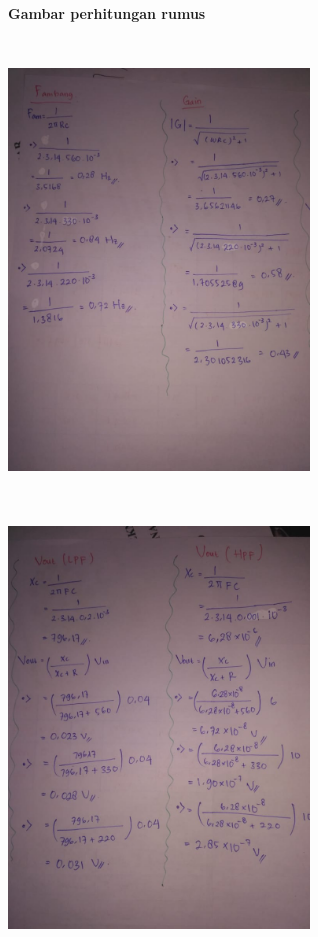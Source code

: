\documentclass[12pt,a4paper]{article}
\begin{document}
\newpage
\begin{figure}
\paragraph{Gambar perhitungan rumus}
\paragraph{ }
\begin{center}

\includegraphics[width=8cm, height=12cm]{Hitung1.png}

\includegraphics[width=8cm, height=12cm]{Hitung2.png}

\end{center}
\end{figure}
\vspace{2cm}
\end{document}
